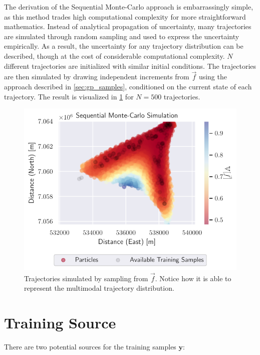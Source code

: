 The derivation of the Sequential Monte-Carlo approach is embarrassingly simple, as this method trades high computational complexity for more straightforward mathematics. Instead of analytical propagation of uncertainty, many trajectories are simulated through random sampling and used to express the uncertainty empirically. As a result, the uncertainty for any trajectory distribution can be described, though at the cost of considerable computational complexity.
$N$ different trajectories are initialized with similar initial conditions. The trajectories are then simulated by drawing independent increments from $\vec{f}$ using the approach described in \cref{sec:gp_samples}, conditioned on the current state of each trajectory. The result is visualized in \cref{fig:gp_particle} for $N=500$ trajectories.
\begin{figure}[h]
    \centering
    \includegraphics[width=\textwidth]{figures/dyngp/gp_particle.pdf}
    \caption{Trajectories simulated by sampling from $\vec{f}$. Notice how it is able to represent the multimodal trajectory distribution. }
    \label{fig:gp_particle}
\end{figure}

\section{Training Source}
There are two potential sources for the training samples $\boldsymbol{y}$:

